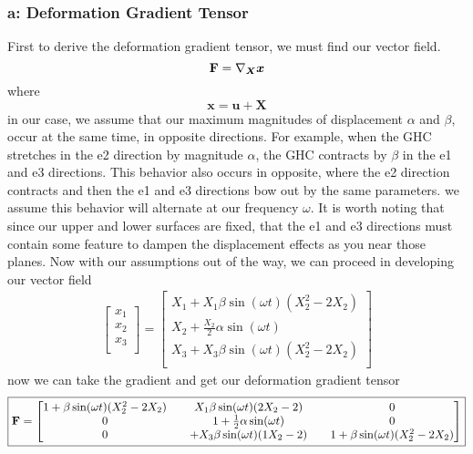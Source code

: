 \subsubsection*{a: Deformation Gradient Tensor}
First to derive the deformation gradient tensor, we must find our vector field. 
\begin{equation}
    \mathbf{F} = \nabla_{\bm{X}}  \bm{x}
\end{equation}
where
\begin{equation}
    \bm{x} = \bm{u} + \bm{X}
\end{equation}
in our case, we assume that our maximum magnitudes of displacement $\alpha$ and $\beta$, occur at the same time, in opposite directions. For example, when the GHC stretches in the e2 direction by magnitude $\alpha$, the GHC contracts by $\beta$ in the e1 and e3 directions. This behavior also occurs in opposite, where the e2 direction contracts and then the e1 and e3 directions bow out by the same parameters. we assume this behavior will alternate at our frequency $\omega$. It is worth noting that since our upper and lower surfaces are fixed, that the e1 and e3 directions must contain some feature to dampen the displacement effects as you near those planes. Now with our assumptions out of the way, we can proceed in developing our vector field
\begin{gather}
\begin{bmatrix}
    x_1 \\
    x_2 \\
    x_3 \\
\end{bmatrix}=
\begin{bmatrix}
    X_1+X_1\beta\sin(\omega t)(X_2^2-2X_2)\\
    X_2+\frac{X_2}{2}\alpha\sin(\omega t)\\
    X_3+X_3\beta\sin(\omega t)(X_2^2-2X_2)\\
\end{bmatrix}
\end{gather}
now we can take the gradient and get our deformation gradient tensor
\begin{gather}
\boxed{
\mathbf{F} =
    \begin{bmatrix}
        1+\beta\sin(\omega t)(X_2^2-2X_2) && X_1\beta\sin(\omega t)(2X_2-2) && 0\\
        0 && 1 + \frac{1}{2}\alpha\sin(\omega t) && 0 \\
        0 && +X_3\beta\sin(\omega t)(1X_2-2) && 1+\beta\sin(\omega t)(X_2^2-2X_2)
    \end{bmatrix}}
\end{gather}
